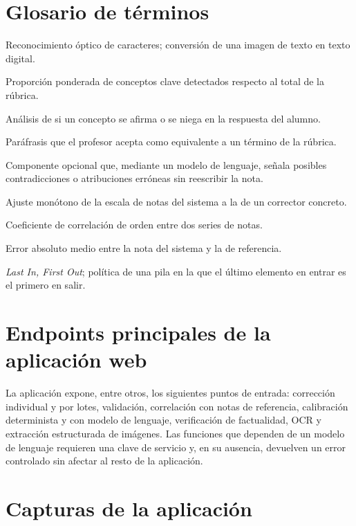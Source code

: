 \section{Glosario de términos}

\begin{description}[leftmargin=2em,style=nextline]
  \item[OCR] Reconocimiento óptico de caracteres; conversión de una imagen de texto en texto digital.
  \item[concept\_ratio] Proporción ponderada de conceptos clave detectados respecto al total de la rúbrica.
  \item[Polaridad] Análisis de si un concepto se afirma o se niega en la respuesta del alumno.
  \item[Sinónimo por concepto] Paráfrasis que el profesor acepta como equivalente a un término de la rúbrica.
  \item[Verificador] Componente opcional que, mediante un modelo de lenguaje, señala posibles contradicciones o atribuciones erróneas sin reescribir la nota.
  \item[Calibración] Ajuste monótono de la escala de notas del sistema a la de un corrector concreto.
  \item[Spearman ($\rho$)] Coeficiente de correlación de orden entre dos series de notas.
  \item[MAE] Error absoluto medio entre la nota del sistema y la de referencia.
  \item[LIFO] \emph{Last In, First Out}; política de una pila en la que el último elemento en entrar es el primero en salir.
\end{description}

\section{Endpoints principales de la aplicación web}

La aplicación expone, entre otros, los siguientes puntos de entrada: corrección individual y por lotes, validación, correlación con notas de referencia, calibración determinista y con modelo de lenguaje, verificación de factualidad, OCR y extracción estructurada de imágenes. Las funciones que dependen de un modelo de lenguaje requieren una clave de servicio y, en su ausencia, devuelven un error controlado sin afectar al resto de la aplicación.

\section{Capturas de la aplicación}
\label{anx:capturas}

